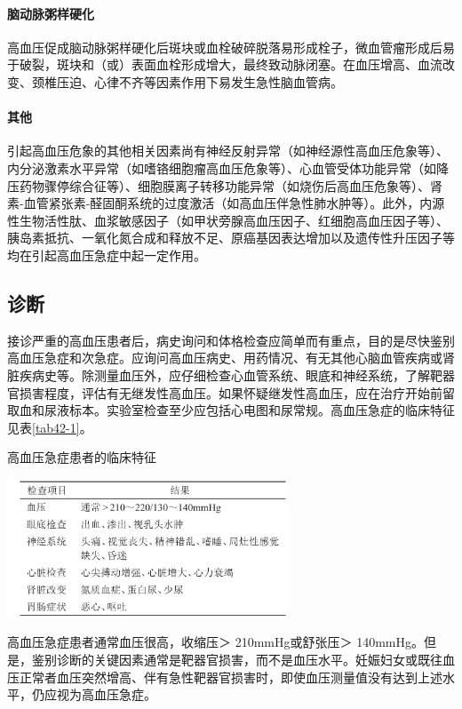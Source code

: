 \paragraph{脑动脉粥样硬化}

高血压促成脑动脉粥样硬化后斑块或血栓破碎脱落易形成栓子，微血管瘤形成后易于破裂，斑块和（或）表面血栓形成增大，最终致动脉闭塞。在血压增高、血流改变、颈椎压迫、心律不齐等因素作用下易发生急性脑血管病。

\paragraph{其他}

引起高血压危象的其他相关因素尚有神经反射异常（如神经源性高血压危象等）、内分泌激素水平异常（如嗜铬细胞瘤高血压危象等）、心血管受体功能异常（如降压药物骤停综合征等）、细胞膜离子转移功能异常（如烧伤后高血压危象等）、肾素-血管紧张素-醛固酮系统的过度激活（如高血压伴急性肺水肿等）。此外，内源性生物活性肽、血浆敏感因子（如甲状旁腺高血压因子、红细胞高血压因子等）、胰岛素抵抗、一氧化氮合成和释放不足、原癌基因表达增加以及遗传性升压因子等均在引起高血压急症中起一定作用。

\subsection{诊断}

接诊严重的高血压患者后，病史询问和体格检查应简单而有重点，目的是尽快鉴别高血压急症和次急症。应询问高血压病史、用药情况、有无其他心脑血管疾病或肾脏疾病史等。除测量血压外，应仔细检查心血管系统、眼底和神经系统，了解靶器官损害程度，评估有无继发性高血压。如果怀疑继发性高血压，应在治疗开始前留取血和尿液标本。实验室检查至少应包括心电图和尿常规。高血压急症的临床特征见表\ref{tab42-1}。

\begin{table}[htbp]
\centering
\caption{高血压急症患者的临床特征}
\label{tab42-1}
\includegraphics[width=3.29167in,height=1.625in]{./images/Image00154.jpg}
\end{table}

高血压急症患者通常血压很高，收缩压＞ 210mmHg或舒张压＞
140mmHg。但是，鉴别诊断的关键因素通常是靶器官损害，而不是血压水平。妊娠妇女或既往血压正常者血压突然增高、伴有急性靶器官损害时，即使血压测量值没有达到上述水平，仍应视为高血压急症。


